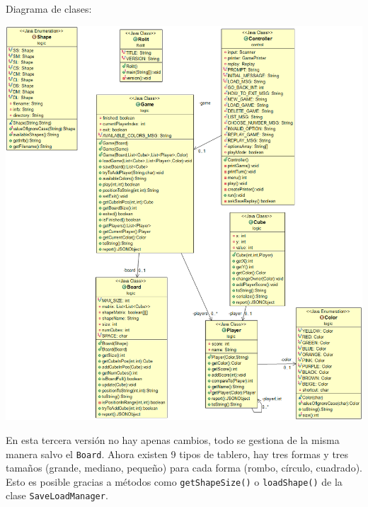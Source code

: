 \documentclass[../DocumentoOficial.tex]{subfiles}
\begin{document}
\begin{sprint}[3]
Diagrama de clases:
\begin{center}
\includegraphics[scale=0.40]{diagramaclasesS3.png}
\end{center}

En esta tercera versión no hay apenas cambios, todo se gestiona de la misma manera salvo el \texttt{Board}. Ahora existen 9 tipos de tablero, hay tres formas y tres tamaños (grande, mediano, pequeño) para cada forma (rombo, círculo, cuadrado). Esto es posible gracias a métodos como \texttt{getShapeSize()} o \texttt{loadShape()} de la clase \texttt{SaveLoadManager}. 

\end{sprint}
\newpage
\end{document}
